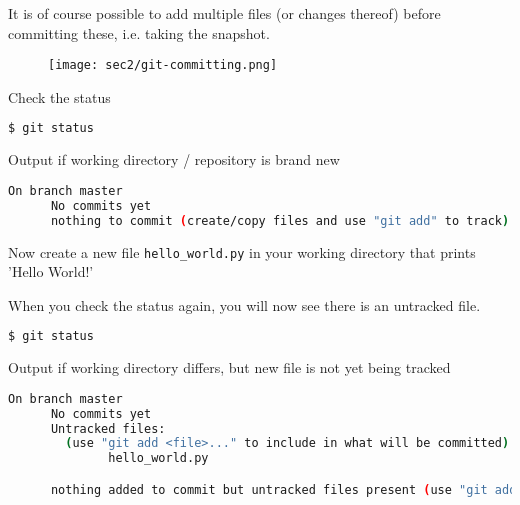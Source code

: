 \begin{frame}[fragile]
\emptyframetitle

  It is of course possible to add multiple files (or changes thereof) before committing these, i.e. taking the snapshot.

  \begin{figure}[h]
    \texttt{[image: sec2/git-committing.png]}
  \end{figure}

\end{frame}

\begin{frame}[fragile]
\emptyframetitle

  Check the status
  \begin{lstlisting}[language=bash]
  $ git status
  \end{lstlisting}

  \begin{block}{Output if working directory / repository is brand new}
    \begin{lstlisting}[language=bash]
      On branch master
      No commits yet
      nothing to commit (create/copy files and use "git add" to track)
    \end{lstlisting}
  \end{block}

  \vspace{0.5cm}
  Now create a new file \texttt{hello\_world.py} in your working directory that prints 'Hello World!'

\end{frame}

\begin{frame}[fragile]
\emptyframetitle
  When you check the status again, you will now see there is an untracked file.
  \begin{lstlisting}[language=bash]
  $ git status
  \end{lstlisting}

  \begin{block}{Output if working directory differs, but new file is not yet being tracked}
    \begin{lstlisting}[language=bash]
      On branch master
      No commits yet
      Untracked files:
        (use "git add <file>..." to include in what will be committed)
              hello_world.py

      nothing added to commit but untracked files present (use "git add" to track)
    \end{lstlisting}
  \end{block}

\end{frame}


